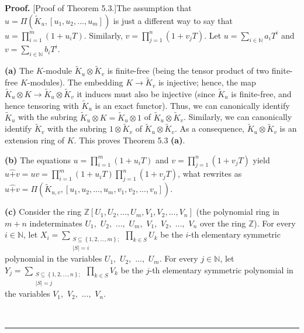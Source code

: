 \documentclass[numbers=enddot,12pt,final,onecolumn,notitlepage]{scrartcl}%
\newenvironment{proof}[1][Proof]{\noindent\textbf{#1.} }{\ \rule{0.5em}{0.5em}}
\begin{document}
\begin{proof}
[Proof of Theorem 5.3.]The assumption that $u=\Pi\left(  \widetilde{K}%
_{u},\left[  u_{1},u_{2},...,u_{m}\right]  \right)  $ is just a different way
to say that $u=\prod\limits_{i=1}^{m}\left(  1+u_{i}T\right)  $. Similarly,
$v=\prod\limits_{j=1}^{n}\left(  1+v_{j}T\right)  $. Let $u=\sum
\limits_{i\in\mathbb{N}}a_{i}T^{i}$ and $v=\sum\limits_{i\in\mathbb{N}}%
b_{i}T^{i}$.

\textbf{(a)} The $K$-module $\widetilde{K}_{u}\otimes\widetilde{K}_{v}$ is
finite-free (being the tensor product of two finite-free $K$-modules). The
embedding $K\rightarrow\widetilde{K}_{v}$ is injective; hence, the map
$\widetilde{K}_{u}\otimes K\rightarrow\widetilde{K}_{u}\otimes\widetilde{K}%
_{v}$ it induces must also be injective (since $\widetilde{K}_{u}$ is
finite-free, and hence tensoring with $\widetilde{K}_{u}$ is an exact
functor). Thus, we can canonically identify $\widetilde{K}_{u}$ with the
subring $\widetilde{K}_{u}\otimes K=\widetilde{K}_{u}\otimes1$ of
$\widetilde{K}_{u}\otimes\widetilde{K}_{v}$. Similarly, we can canonically
identify $\widetilde{K}_{v}$ with the subring $1\otimes\widetilde{K}_{v}$ of
$\widetilde{K}_{u}\otimes\widetilde{K}_{v}$. As a consequence, $\widetilde{K}%
_{u}\otimes\widetilde{K}_{v}$ is an extension ring of $K$. This proves Theorem
5.3 \textbf{(a)}.

\textbf{(b)} The equations $u=\prod\limits_{i=1}^{m}\left(  1+u_{i}T\right)  $
and $v=\prod\limits_{j=1}^{n}\left(  1+v_{j}T\right)  $ yield $u\widehat{+}%
v=uv=\prod\limits_{i=1}^{m}\left(  1+u_{i}T\right)  \prod\limits_{j=1}%
^{n}\left(  1+v_{j}T\right)  $, what rewrites as $u\widehat{+}v=\Pi\left(
\widetilde{K}_{u,v},\left[  u_{1},u_{2},...,u_{m},v_{1},v_{2},...,v_{n}%
\right]  \right)  .$

\textbf{(c)} Consider the ring $\mathbb{Z}\left[  U_{1},U_{2},...,U_{m}%
,V_{1},V_{2},...,V_{n}\right]  $ (the polynomial ring in $m+n$ indeterminates
$U_{1},$ $U_{2},$ $...,$ $U_{m},$ $V_{1},$ $V_{2},$ $...,$ $V_{n}$ over the
ring $\mathbb{Z}$). For every $i\in\mathbb{N}$, let $X_{i}=\sum
\limits_{\substack{S\subseteq\left\{  1,2,...,m\right\}  ;\\\left\vert
S\right\vert =i}}\prod\limits_{k\in S}U_{k}$ be the $i$-th elementary
symmetric polynomial in the variables $U_{1},$ $U_{2},$ $...,$ $U_{m}$. For
every $j\in\mathbb{N}$, let $Y_{j}=\sum\limits_{\substack{S\subseteq\left\{
1,2,...,n\right\}  ;\\\left\vert S\right\vert =j}}\prod\limits_{k\in S}V_{k}$
be the $j$-th elementary symmetric polynomial in the variables $V_{1},$
$V_{2},$ $...,$ $V_{n}$.


\end{proof}
\end{document}

